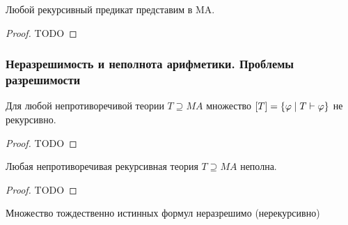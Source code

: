 \begin{theorem}
    Любой рекурсивный предикат представим в MA.
\end{theorem}
\begin{proof}
    TODO %
\end{proof}


\subsubsection{Неразрешимость и неполнота арифметики. Проблемы разрешимости}

\begin{theorem}
    Для любой непротиворечивой теории $T\supseteq MA$ множество $[T]=\{\varphi\mid T\vdash \varphi\}$ не рекурсивно. 
\end{theorem}
\begin{proof}
    TODO %
\end{proof}

\begin{theorem}
    Любая непротиворечивая рекурсивная теория $T\supseteq MA$ неполна.
\end{theorem}
\begin{proof}
    TODO %
\end{proof}

\begin{theorem}
    Множество тождественно истинных формул неразрешимо (нерекурсивно)
\end{theorem}
